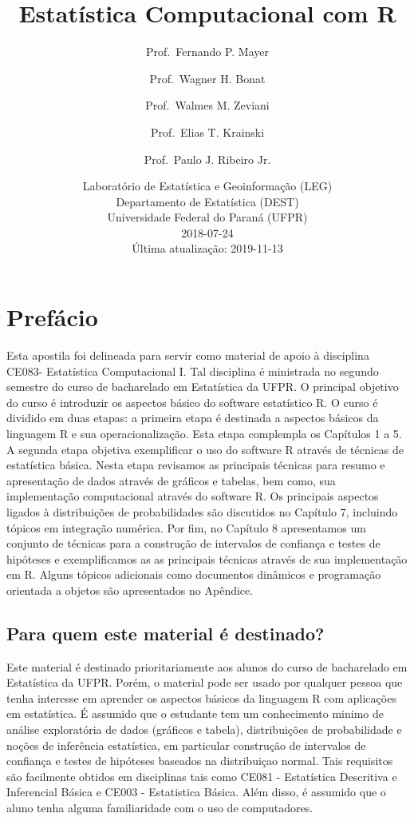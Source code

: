 \documentclass[10pt,a4paper]{book}
\title{Estatística Computacional com R}
\author{Prof.~Fernando P. Mayer \and Prof.~Wagner H. Bonat \and Prof.~Walmes M. Zeviani \and Prof.~Elias T. Krainski \and Prof.~Paulo J. Ribeiro Jr.}
\date{Laboratório de Estatística e Geoinformação (LEG)\\
Departamento de Estatística (DEST)\\
Universidade Federal do Paraná (UFPR)\\[2\baselineskip]2018-07-24\\
Última atualização: 2019-11-13}
\begin{document}
\maketitle

{
\hypersetup{linkcolor=black}
\setcounter{tocdepth}{2}
\tableofcontents
}
\chapter*{Prefácio}\label{prefuxe1cio}


Esta apostila foi delineada para servir como material de apoio à
disciplina CE083- Estatística Computacional I. Tal disciplina é
ministrada no segundo semestre do curso de bacharelado em Estatística da
UFPR. O principal objetivo do curso é introduzir os aspectos básico do
software estatístico R. O curso é dividido em duas etapas: a primeira
etapa é destinada a aspectos básicos da linguagem R e sua
operacionalização. Esta etapa complempla os Capítulos 1 a 5. A segunda
etapa objetiva exemplificar o uso do software R através de técnicas de
estatística básica. Nesta etapa revisamos as principais técnicas para
resumo e apresentação de dados através de gráficos e tabelas, bem como,
sua implementação computacional através do software R. Os principais
aspectos ligados à distribuições de probabilidades são discutidos no
Capítulo 7, incluindo tópicos em integração numérica. Por fim, no
Capítulo 8 apresentamos um conjunto de técnicas para a construção de
intervalos de confiança e testes de hipóteses e exemplificamos as as
principais técnicas através de sua implementação em R. Alguns tópicos
adicionais como documentos dinâmicos e programação orientada a objetos
são apresentados no Apêndice.

\section*{Para quem este material é
destinado?}\label{para-quem-este-material-uxe9-destinado}


Este material é destinado prioritariamente aos alunos do curso de
bacharelado em Estatística da UFPR. Porém, o material pode ser usado por
qualquer pessoa que tenha interesse em aprender os aspectos básicos da
linguagem R com aplicações em estatística. É assumido que o estudante
tem um conhecimento minimo de análise exploratória de dados (gráficos e
tabela), distribuições de probabilidade e noções de inferência
estatística, em particular construção de intervalos de confiança e
testes de hipóteses baseados na distribuiçao normal. Tais requisitos são
facilmente obtidos em disciplinas tais como CE081 - Estatística
Descritiva e Inferencial Básica e CE003 - Estatistica Básica. Além
disso, é assumido que o aluno tenha alguma familiaridade com o uso de
computadores.
\end{document}
